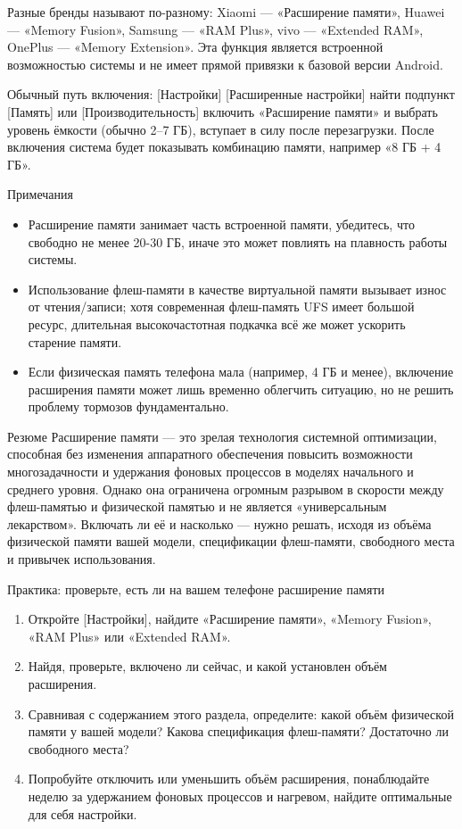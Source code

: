 Разные бренды называют по-разному: Xiaomi — «Расширение памяти», Huawei — «Memory Fusion», Samsung — «RAM Plus», vivo — «Extended RAM», OnePlus — «Memory Extension». Эта функция является встроенной возможностью системы и не имеет прямой привязки к базовой версии Android.

Обычный путь включения: [Настройки] [Расширенные настройки] найти подпункт [Память] или [Производительность] включить «Расширение памяти» и выбрать уровень ёмкости (обычно 2–7 ГБ), вступает в силу после перезагрузки. После включения система будет показывать комбинацию памяти, например «8 ГБ + 4 ГБ».

\begin{tcbwarn}{Примечания}
\begin{itemize}
  \item Расширение памяти занимает часть встроенной памяти, убедитесь, что свободно не менее 20-30 ГБ, иначе это может повлиять на плавность работы системы.
  \item Использование флеш-памяти в качестве виртуальной памяти вызывает износ от чтения/записи; хотя современная флеш-память UFS имеет большой ресурс, длительная высокочастотная подкачка всё же может ускорить старение памяти.
  \item Если физическая память телефона мала (например, 4 ГБ и менее), включение расширения памяти может лишь временно облегчить ситуацию, но не решить проблему тормозов фундаментально.
\end{itemize}

\end{tcbwarn}

\begin{tcbinfo}{Резюме}
Расширение памяти — это зрелая технология системной оптимизации, способная без изменения аппаратного обеспечения повысить возможности многозадачности и удержания фоновых процессов в моделях начального и среднего уровня. Однако она ограничена огромным разрывом в скорости между флеш-памятью и физической памятью и не является «универсальным лекарством». Включать ли её и насколько — нужно решать, исходя из объёма физической памяти вашей модели, спецификации флеш-памяти, свободного места и привычек использования.

\end{tcbinfo}

\begin{tcbpractice}{Практика: проверьте, есть ли на вашем телефоне расширение памяти}
\begin{enumerate}
  \item Откройте [Настройки], найдите «Расширение памяти», «Memory Fusion», «RAM Plus» или «Extended RAM».
  \item Найдя, проверьте, включено ли сейчас, и какой установлен объём расширения.
  \item Сравнивая с содержанием этого раздела, определите: какой объём физической памяти у вашей модели? Какова спецификация флеш-памяти? Достаточно ли свободного места?
  \item Попробуйте отключить или уменьшить объём расширения, понаблюдайте неделю за удержанием фоновых процессов и нагревом, найдите оптимальные для себя настройки.
\end{enumerate}

\end{tcbpractice}
